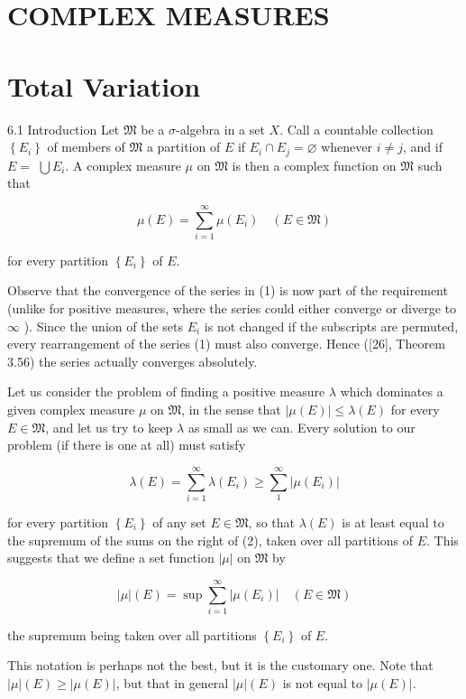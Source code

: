 \documentclass[10pt]{article}
\begin{document}
\section{COMPLEX MEASURES}
\section{Total Variation}
6.1 Introduction Let $\mathfrak{M}$ be a $\sigma$-algebra in a set $X$. Call a countable collection $\left\{E_{i}\right\}$ of members of $\mathfrak{M}$ a partition of $E$ if $E_{i} \cap E_{j}=\varnothing$ whenever $i \neq j$, and if $E=$ $\bigcup E_{i}$. A complex measure $\mu$ on $\mathfrak{M}$ is then a complex function on $\mathfrak{M}$ such that

$$
\mu(E)=\sum_{i=1}^{\infty} \mu\left(E_{i}\right) \quad(E \in \mathfrak{M})
$$

for every partition $\left\{E_{i}\right\}$ of $E$.

Observe that the convergence of the series in (1) is now part of the requirement (unlike for positive measures, where the series could either converge or diverge to $\infty$ ). Since the union of the sets $E_{i}$ is not changed if the subscripts are permuted, every rearrangement of the series (1) must also converge. Hence ([26], Theorem 3.56) the series actually converges absolutely.

Let us consider the problem of finding a positive measure $\lambda$ which dominates a given complex measure $\mu$ on $\mathfrak{M}$, in the sense that $|\mu(E)| \leq \lambda(E)$ for every $E \in \mathfrak{M}$, and let us try to keep $\lambda$ as small as we can. Every solution to our problem (if there is one at all) must satisfy

$$
\lambda(E)=\sum_{i=1}^{\infty} \lambda\left(E_{i}\right) \geq \sum_{1}^{\infty}\left|\mu\left(E_{i}\right)\right|
$$

for every partition $\left\{E_{i}\right\}$ of any set $E \in \mathfrak{M}$, so that $\lambda(E)$ is at least equal to the supremum of the sums on the right of (2), taken over all partitions of $E$. This suggests that we define a set function $|\mu|$ on $\mathfrak{M}$ by

$$
|\mu|(E)=\sup \sum_{i=1}^{\infty}\left|\mu\left(E_{i}\right)\right| \quad(E \in \mathfrak{M})
$$

the supremum being taken over all partitions $\left\{E_{i}\right\}$ of $E$.

This notation is perhaps not the best, but it is the customary one. Note that $|\mu|(E) \geq|\mu(E)|$, but that in general $|\mu|(E)$ is not equal to $|\mu(E)|$.
\end{document}
